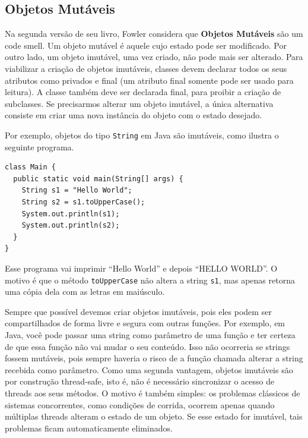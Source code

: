 \documentclass[
  11pt,
  twoside]{book}
\newcommand{\passthrough}[1]{#1}
\begin{document}
\hypertarget{objetos-mutuxe1veis}{%
\subsection{Objetos Mutáveis}\label{objetos-mutuxe1veis}}


Na segunda versão de seu livro, Fowler considera que \textbf{Objetos
Mutáveis} são um code smell. Um objeto mutável é aquele cujo estado pode
ser modificado. Por outro lado, um objeto imutável, uma vez criado, não
pode mais ser alterado. Para viabilizar a criação de objetos imutáveis,
classes devem declarar todos os seus atributos como privados e final (um
atributo final somente pode ser usado para leitura). A classe também
deve ser declarada final, para proibir a criação de subclasses. Se
precisarmos alterar um objeto imutável, a única alternativa consiste em
criar uma nova instância do objeto com o estado desejado.

Por exemplo, objetos do tipo \passthrough{\lstinline!String!} em Java
são imutáveis, como ilustra o seguinte programa.

\begin{lstlisting}
class Main {
  public static void main(String[] args) {
    String s1 = "Hello World";
    String s2 = s1.toUpperCase();
    System.out.println(s1);
    System.out.println(s2);
  }
}
\end{lstlisting}

Esse programa vai imprimir ``Hello World'' e depois ``HELLO WORLD''. O
motivo é que o método \passthrough{\lstinline!toUpperCase!} não altera a
string \passthrough{\lstinline!s1!}, mas apenas retorna uma cópia dela
com as letras em maiúsculo.

Sempre que possível devemos criar objetos imutáveis, pois eles podem ser
compartilhados de forma livre e segura com outras funções. Por exemplo,
em Java, você pode passar uma string como parâmetro de uma função e ter
certeza de que essa função não vai mudar o seu conteúdo. Isso não
ocorreria se strings fossem mutáveis, pois sempre haveria o risco de a
função chamada alterar a string recebida como parâmetro. Como uma
segunda vantagem, objetos imutáveis são por construção thread-safe, isto
é, não é necessário sincronizar o acesso de threads aos seus métodos. O
motivo é também simples: os problemas clássicos de sistemas
concorrentes, como condições de corrida, ocorrem apenas quando múltiplas
threads alteram o estado de um objeto. Se esse estado for imutável, tais
problemas ficam automaticamente eliminados.
\end{document}
